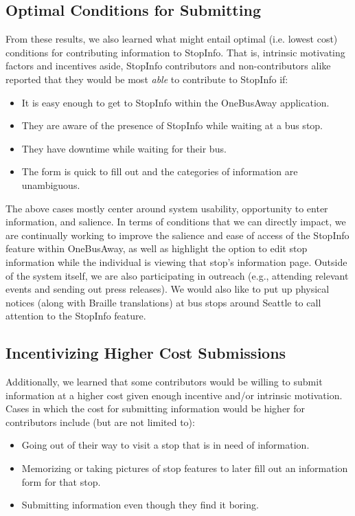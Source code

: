 \subsection{Optimal Conditions for Submitting}
From these results, we also learned what might entail optimal (i.e. lowest cost) conditions for contributing information to StopInfo. That is, intrinsic motivating factors and incentives aside, StopInfo contributors and non-contributors alike reported that they would be most \emph{able} to contribute to StopInfo if:
\begin{itemize}[leftmargin=8mm]
\item It is easy enough to get to StopInfo within the OneBusAway application.
\item They are aware of the presence of StopInfo while waiting at a bus stop.
\item They have downtime while waiting for their bus.
\item The form is quick to fill out and the categories of information are unambiguous.
\end{itemize}

The above cases mostly center around system usability, opportunity to enter information, and salience. In terms of conditions that we can directly impact, we are continually working to improve the salience and ease of access of the StopInfo feature within OneBusAway, as well as highlight the option to edit stop information while the individual is viewing that stop's information page. Outside of the system itself, we are also participating in outreach (e.g., attending relevant events and sending out press releases). We would also like to put up physical notices (along with Braille translations) at bus stops around Seattle to call attention to the StopInfo feature.

\subsection{Incentivizing Higher Cost Submissions}

Additionally, we learned that some contributors would be willing to submit information at a higher cost given enough incentive and/or intrinsic motivation. Cases in which the cost for submitting information would be higher for contributors include (but are not limited to):
\begin{itemize}[leftmargin=8mm]
\item Going out of their way to visit a stop that is in need of information.
\item Memorizing or taking pictures of stop features to later fill out an information form for that stop.
\item Submitting information even though they find it boring.
\end{itemize}


